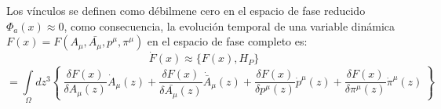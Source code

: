 \documentclass[a4paper,12pt]{article}
\begin{document}
Los vínculos se definen como débilmene cero en el espacio de fase \mbox{reducido $\Phi_a(x)\approx0$,} como consecuencia, la evolución temporal de una variable \mbox{dinámica \mbox{$F(x)=F(A_\mu,\bar{A_\mu},p^\mu,\pi^\mu)$}} en el espacio de fase completo es:
\begin{equation}
\dot F(x)\approx\{F(x),H_P\}
\end{equation}
$$=\int\limits_{\Omega}dz^3\left\{\ \frac{\delta F(x)}{\delta A_\mu(z)}\dot A_\mu(z)+\frac{\delta F(x)}{\delta \bar{A_\mu}(z)}\dot{\bar{A}}_\mu(z)+\frac{\delta F(x)}{\delta p^\mu(z) }\dot p^{\mu}(z)+\frac{\delta F(x)}{\delta \pi^{\mu}(z) }\dot\pi^{\mu}(z)\ \right\} $$
\vspace{0,4cm}

\\
\end{document}
